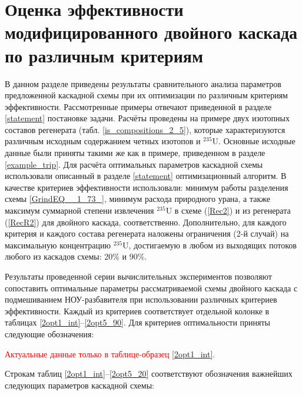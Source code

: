 \section{Оценка эффективности модифицированного двойного каскада по различным критериям}

В данном разделе приведены результаты сравнительного анализа параметров предложенной каскадной схемы при их оптимизации по различным критериям эффективности. Рассмотренные примеры отвечают приведенной в разделе \ref{statement} постановке задачи. Расчёты проведены на примере двух изотопных составов регенерата (табл. \ref{is_compositions_2_5}), которые характеризуются различным исходным содержанием четных изотопов и $^{235}$U. Основные исходные данные были приняты такими же как в примере, приведенном в разделе \ref{example_trip}. Для расчёта оптимальных параметров каскадной схемы использовали описанный в разделе \ref{statement} оптимизационный алгоритм. В качестве критериев эффективности использовали: минимум работы разделения схемы \ref{GrindEQ__1_73_}, минимум расхода природного урана, а также максимум суммарной степени извлечения $^{235}$U в схеме (\ref{Rec2}) и из регенерата (\ref{RecR2}) для двойного каскада, соответственно. Дополнительно, для каждого критерия и каждого состава регенерата наложены ограничения (2-й случай) на максимальную концентрацию $^{235}$U, достигаемую в любом из выходящих потоков любого из каскадов схемы: 20\% и 90\%. 

Результаты проведенной серии вычислительных экспериментов позволяют сопоставить оптимальные параметры рассматриваемой схемы двойного каскада с подмешиванием НОУ-разбавителя при использовании различных критериев эффективности. Каждый из критериев соответствует отдельной колонке в таблицах \ref{2opt1_int}--\ref{2opt5_90}. Для критериев оптимальности приняты следующие обозначения:


\textcolor{red}{Актуальные данные только в таблице-образец  \ref{2opt1_int}.}

Строкам таблиц \ref{2opt1_int}--\ref{2opt5_20} соответствуют обозначения важнейших следующих параметров каскадной схемы:

